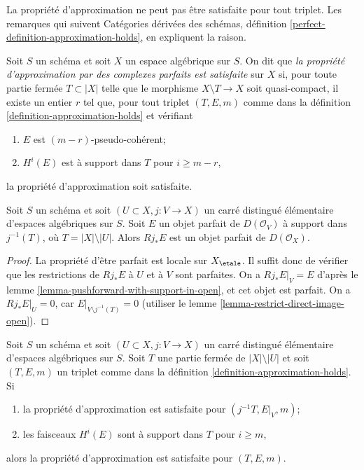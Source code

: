\noindent
La propri\'et\'e d'approximation ne peut pas \^etre satisfaite pour tout
triplet. Les remarques qui suivent Cat\'egories d\'eriv\'ees des sch\'emas,
d\'efinition \ref{perfect-definition-approximation-holds}, en expliquent la
raison.

\begin{definition}
\label{definition-approximation}
Soit $S$ un sch\'ema et soit $X$ un espace alg\'ebrique sur $S$.
On dit que {\it la propri\'et\'e d'approximation par des complexes parfaits est
satisfaite} sur $X$ si, pour toute partie ferm\'ee $T \subset |X|$ telle que le
morphisme $X \setminus T \to X$ soit quasi-compact, il existe un entier $r$
tel que, pour tout triplet $(T,E,m)$ comme dans la d\'efinition
\ref{definition-approximation-holds} et v\'erifiant
\begin{enumerate}
\item $E$ est $(m-r)$-pseudo-coh\'erent;
\item $H^i(E)$ est \`a support dans $T$ pour $i \geq m-r$,
\end{enumerate}
la propri\'et\'e d'approximation soit satisfaite.
\end{definition}

\begin{lemma}
\label{lemma-pushforward-perfect}
Soit $S$ un sch\'ema et soit $(U \subset X, j : V \to X)$ un carr\'e
distingu\'e \'el\'ementaire d'espaces alg\'ebriques sur $S$.
Soit $E$ un objet parfait de $D(\mathcal{O}_V)$ \`a support dans
$j^{-1}(T)$, o\`u $T=|X|\setminus|U|$. Alors $Rj_*E$ est un objet parfait de
$D(\mathcal{O}_X)$.
\end{lemma}

\begin{proof}
La propri\'et\'e d'\^etre parfait est locale sur $X_\etale$. Il suffit donc de
v\'erifier que les restrictions de $Rj_*E$ \`a $U$ et \`a $V$ sont parfaites.
On a $Rj_*E|_V=E$ d'apr\`es le lemme
\ref{lemma-pushforward-with-support-in-open}, et cet objet est parfait.
On a $Rj_*E|_U=0$, car $E|_{V\setminus j^{-1}(T)}=0$ (utiliser le lemme
\ref{lemma-restrict-direct-image-open}).
\end{proof}

\begin{lemma}
\label{lemma-open}
Soit $S$ un sch\'ema et soit $(U \subset X,j : V \to X)$ un carr\'e distingu\'e
\'el\'ementaire d'espaces alg\'ebriques sur $S$. Soit $T$ une partie ferm\'ee de
$|X|\setminus|U|$ et soit $(T,E,m)$ un triplet comme dans la d\'efinition
\ref{definition-approximation-holds}. Si
\begin{enumerate}
\item la propri\'et\'e d'approximation est satisfaite pour
$(j^{-1}T,E|_V,m)$;
\item les faisceaux $H^i(E)$ sont \`a support dans $T$ pour $i\geq m$,
\end{enumerate}
alors la propri\'et\'e d'approximation est satisfaite pour $(T,E,m)$.
\end{lemma}

